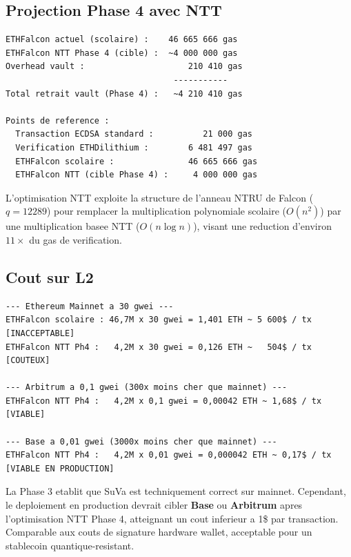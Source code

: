 \documentclass[11pt,a4paper]{article}
\begin{document}
\subsection{Projection Phase 4 avec NTT}

\begin{lstlisting}[style=bash, caption={Projection de gas Phase 4}]
ETHFalcon actuel (scolaire) :    46 665 666 gas
ETHFalcon NTT Phase 4 (cible) :  ~4 000 000 gas
Overhead vault :                     210 410 gas
                                  -----------
Total retrait vault (Phase 4) :   ~4 210 410 gas

Points de reference :
  Transaction ECDSA standard :          21 000 gas
  Verification ETHDilithium :        6 481 497 gas
  ETHFalcon scolaire :               46 665 666 gas
  ETHFalcon NTT (cible Phase 4) :     4 000 000 gas
\end{lstlisting}

L'optimisation NTT exploite la structure de l'anneau NTRU de Falcon ($q = 12289$) pour remplacer
la multiplication polynomiale scolaire ($O(n^2)$) par une multiplication basee NTT ($O(n \log n)$),
visant une reduction d'environ $11\times$ du gas de verification.

\subsection{Cout sur L2}

\begin{lstlisting}[style=bash, caption={Projections de cout sur L2 (ETH = 4 000$)}]
--- Ethereum Mainnet a 30 gwei ---
ETHFalcon scolaire : 46,7M x 30 gwei = 1,401 ETH ~ 5 600$ / tx  [INACCEPTABLE]
ETHFalcon NTT Ph4 :   4,2M x 30 gwei = 0,126 ETH ~   504$ / tx  [COUTEUX]

--- Arbitrum a 0,1 gwei (300x moins cher que mainnet) ---
ETHFalcon NTT Ph4 :   4,2M x 0,1 gwei = 0,00042 ETH ~ 1,68$ / tx  [VIABLE]

--- Base a 0,01 gwei (3000x moins cher que mainnet) ---
ETHFalcon NTT Ph4 :   4,2M x 0,01 gwei = 0,000042 ETH ~ 0,17$ / tx  [VIABLE EN PRODUCTION]
\end{lstlisting}

\begin{infobox}
La Phase 3 etablit que SuVa est techniquement correct sur mainnet. Cependant, le deploiement
en production devrait cibler \textbf{Base} ou \textbf{Arbitrum} apres l'optimisation NTT Phase 4,
atteignant un cout inferieur a 1\$ par transaction. Comparable aux couts de signature hardware
wallet, acceptable pour un stablecoin quantique-resistant.
\end{infobox}
\end{document}
